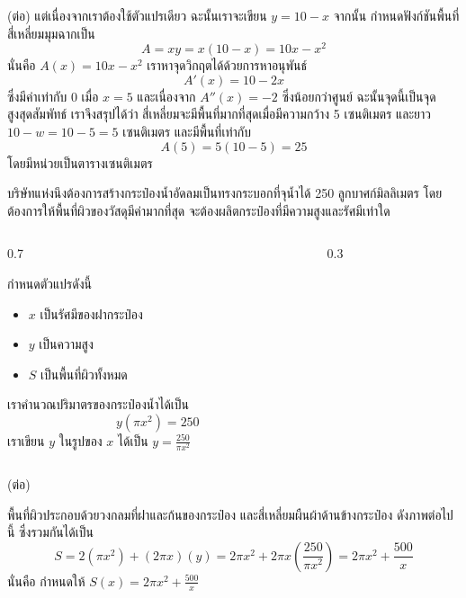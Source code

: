 \begin{frame}
\begin{sol} (ต่อ)
แต่เนื่องจากเราต้องใช้ตัวแปรเดียว ฉะนั้นเราจะเขียน $y = 10-x$ จากนั้น กำหนดฟังก์ชันพื้นที่สี่เหลี่ยมมุมฉากเป็น
\[A = xy = x(10-x) = 10x - x^2\]
นั่นคือ $A(x) = 10x - x^2$ เราหาจุดวิกฤตได้ด้วยการหาอนุพันธ์ 
\[A'(x) = 10 - 2x\]
ซึ่งมีค่าเท่ากับ 0 เมื่อ $x=5$ และเนื่องจาก $A''(x) = -2$ ซึ่งน้อยกว่าศูนย์ ฉะนั้นจุดนี้เป็นจุดสูงสุดสัมพัทธ์ เราจึงสรุปได้ว่า สี่เหลี่ยมจะมีพื้นที่มากที่สุดเมื่อมีความกว้าง 5 เซนติเมตร และยาว $10-w=10-5=5$ เซนติเมตร และมีพื้นที่เท่ากับ
\[A(5) = 5(10-5) = 25\]
โดยมีหน่วยเป็นตารางเซนติเมตร
\end{sol}
\end{frame}


\begin{frame}[t]
\begin{ex}
บริษัทแห่งนึงต้องการสร้างกระป๋องน้ำอัดลมเป็นทรงกระบอกที่จุน้ำได้ 250 ลูกบาศก์มิลลิเมตร โดยต้องการให้พื้นที่ผิวของวัสดุมีค่ามากที่สุด จะต้องผลิตกระป๋องที่มีความสูงและรัศมีเท่าใด
\end{ex} 
\begin{columns}
\begin{column}{0.7\textwidth}
\begin{sol} กำหนดตัวแปรดังนี้
\begin{itemize}
\item $x$ เป็นรัศมีของฝากระป๋อง
\item $y$ เป็นความสูง
\item $S$ เป็นพื้นที่ผิวทั้งหมด
\end{itemize}
เราคำนวณปริมาตรของกระป๋องน้ำได้เป็น
\[y(\pi x^2) = 250\] 
เราเขียน $y$ ในรูปของ $x$ ได้เป็น $y = \frac{250}{\pi x^2}$
\end{sol}
\end{column}
\begin{column}{0.3\textwidth}
\end{column}
\end{columns}
\end{frame}

\begin{frame}
\begin{sol} (ต่อ)

พื้นที่ผิวประกอบด้วยวงกลมที่ฝาและก้นของกระป๋อง และสี่เหลี่ยมผืนผ้าด้านข้างกระป๋อง ดังภาพต่อไปนี้
ซึ่งรวมกันได้เป็น
\[S = 2(\pi x^2) + (2\pi x)(y) = 2\pi x^2 + 2\pi x \left( \frac{250}{\pi x^2}\right) = 2\pi x^2 + \frac{500}{x}\]
นั่นคือ กำหนดให้ $S(x) = 2\pi x^2 + \tfrac{500}{x}$ 
\end{sol}
\end{frame}

